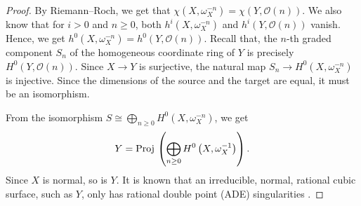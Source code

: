 \documentclass[reqno]{amsart}
\renewcommand{\to}{{\longrightarrow}}
\numberwithin{equation}{section}
\renewcommand{\O}{\mathcal{O}}
\newcommand{\Proj}{{\text{\rm Proj}\,}}
\begin{document}
\begin{proof}
  By Riemann--Roch, we get that $\chi(X,\omega_X^{-n}) = \chi(Y, \O(n))$.
  We also know that for $i > 0$ and $n \geq 0$, both $h^i(X, \omega_X^{-n})$ and $h^i(Y, \O(n))$ vanish.
  Hence, we get $h^0(X, \omega_X^{-n}) = h^0(Y, \O(n))$.
  Recall that, the $n$-th graded component $S_n$ of the homogeneous coordinate ring of $Y$ is precisely $H^0(Y, \O(n))$.
  Since $X \to Y$ is surjective, the natural map $S_n \to H^0(X, \omega_X^{-n})$ is injective.
  Since the dimensions of the source and the target are equal, it must be an isomorphism.

  From the isomorphism $S \cong \bigoplus_{n \geq 0} H^0(X, \omega_X^{-n})$, we get
  \[ Y = \Proj\left( \bigoplus_{n \geq 0}H^0\left(X, \omega_X^{-1} \right) \right).\]
  Since $X$ is normal, so is $Y$.
  It is known that an irreducible, normal, rational cubic surface, such as $Y$, only has rational double point (ADE) singularities \cite{bru.wal:79}.
\end{proof}
\end{document}
